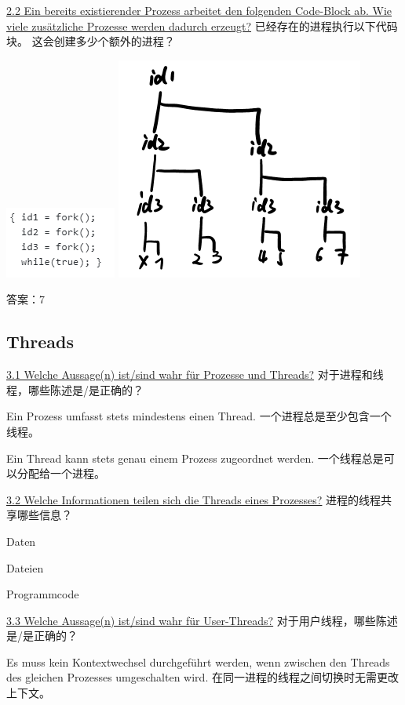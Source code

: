 \documentclass[fleqn]{article}
\begin{document}
\noindent\uline{2.2 Ein bereits existierender Prozess arbeitet den folgenden Code-Block ab. Wie viele zusätzliche Prozesse werden dadurch erzeugt?}
已经存在的进程执行以下代码块。 这会创建多少个额外的进程？

\begin{center}
    \includegraphics{2.png}
    \includegraphics[scale=0.3]{3.png}
\end{center}

答案：7

\subsection{Threads}

\noindent\uline{3.1 Welche Aussage(n) ist/sind wahr für Prozesse und Threads?}
对于进程和线程，哪些陈述是/是正确的？

Ein Prozess umfasst stets mindestens einen Thread.
一个进程总是至少包含一个线程。

Ein Thread kann stets genau einem Prozess zugeordnet werden.
一个线程总是可以分配给一个进程。

\noindent\uline{3.2 Welche Informationen teilen sich die Threads eines Prozesses?}
进程的线程共享哪些信息？

Daten

Dateien
	
Programmcode

\noindent\uline{3.3 Welche Aussage(n) ist/sind wahr für User-Threads?}
对于用户线程，哪些陈述是/是正确的？

Es muss kein Kontextwechsel durchgeführt werden, wenn zwischen den Threads des gleichen Prozesses umgeschalten wird.
在同一进程的线程之间切换时无需更改上下文。
\end{document}
